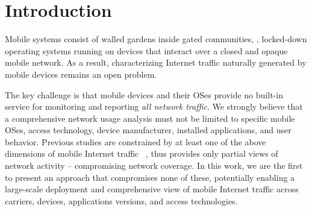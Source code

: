 \section{Introduction}
\label{sec:introduction}

Mobile systems consist of walled gardens inside gated communities, \ie{}, locked-down operating systems running on devices that interact over a closed and opaque mobile network. 
As a result, characterizing Internet traffic naturally generated by mobile devices remains an open problem. 

The key challenge is that mobile devices and their OSes provide no built-in service for monitoring and reporting \emph{all network traffic}. 
We strongly believe that a comprehensive network usage analysis must not be limited to specific mobile OSes, access technology, device manufacturer, installed applications, and user behavior. 
Previous studies are constrained by at least one of the above dimensions of mobile Internet traffic ~\cite{vallina-rod:ads,gerber:passivespeed,chen:wifi,enck:taintdroid,wang:middleboxes,sommers:cellwifi}, thus provides only partial views of network activity -- compromising network coverage. 
In this work, we are the first to present an approach that compromises none of these, potentially enabling a large-scale deployment and comprehensive view of  mobile Internet traffic across carriers, devices, applications versions, and access technologies.


